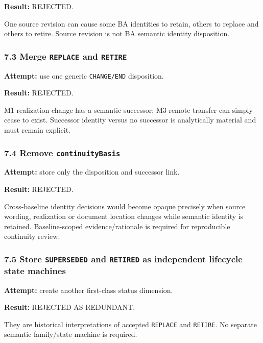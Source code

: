 \documentclass[11pt,a4paper]{article}
\begin{document}
\textbf{Result:} REJECTED.

One source revision can cause some BA identities to retain, others to replace and others to retire. Source revision is not BA semantic identity disposition.

\subsubsection{\texorpdfstring{7.3 Merge \texttt{REPLACE} and \texttt{RETIRE}}{7.3 Merge REPLACE and RETIRE}}\label{merge-replace-and-retire}

\textbf{Attempt:} use one generic \texttt{CHANGE/END} disposition.

\textbf{Result:} REJECTED.

M1 realization change has a semantic successor; M3 remote transfer can simply cease to exist. Successor identity versus no successor is analytically material and must remain explicit.

\subsubsection{\texorpdfstring{7.4 Remove \texttt{continuityBasis}}{7.4 Remove continuityBasis}}\label{remove-continuitybasis}

\textbf{Attempt:} store only the disposition and successor link.

\textbf{Result:} REJECTED.

Cross-baseline identity decisions would become opaque precisely when source wording, realization or document location changes while semantic identity is retained. Baseline-scoped evidence/rationale is required for reproducible continuity review.

\subsubsection{\texorpdfstring{7.5 Store \texttt{SUPERSEDED} and \texttt{RETIRED} as independent lifecycle state machines}{7.5 Store SUPERSEDED and RETIRED as independent lifecycle state machines}}\label{store-superseded-and-retired-as-independent-lifecycle-state-machines}

\textbf{Attempt:} create another first-class status dimension.

\textbf{Result:} REJECTED AS REDUNDANT.

They are historical interpretations of accepted \texttt{REPLACE} and \texttt{RETIRE}. No separate semantic family/state machine is required.
\end{document}
